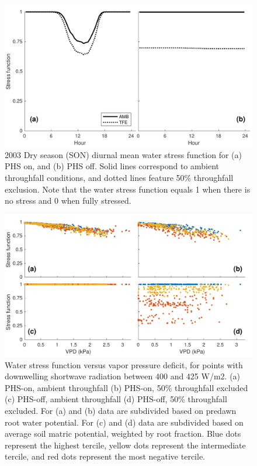 \documentclass[draft,linenumbers]{agujournal}
\begin{document}
          \clearpage
    \begin{figure}[h]
     \centering
     \includegraphics[width=30pc]{../figs/fig4.pdf}
     \caption{2003 Dry season (SON) diurnal mean water stress function for 
     (a) PHS on, and
     (b) PHS off.
     Solid lines correspond to ambient throughfall conditions, and dotted lines feature 50\% throughfall exclusion.
     Note that the water stress function equals 1 when there is no stress and 0 when fully stressed.
     }
     \label{fig4}
  \end{figure}
  
      \clearpage
    \begin{figure}[h]
     \centering
     \includegraphics[width=30pc]{../figs/fig5.pdf}
     \caption{Water stress function versus vapor pressure deficit, for points with downwelling shortwave radiation between 400 and 425 W/m2.
     (a) PHS-on, ambient throughfall
     (b) PHS-on, 50\% throughfall excluded
     (c) PHS-off, ambient throughfall
     (d) PHS-off, 50\% throughfall excluded. 
     For (a) and (b) data are subdivided based on predawn root water potential.
     For (c) and (d) data are subdivided based on average soil matric potential, weighted by root fraction.
     Blue dots represent the highest tercile, yellow dots represent the intermediate tercile, and red dots represent the most negative tercile.
     }
     \label{fig5}
       \end{figure}
  
\end{document}
